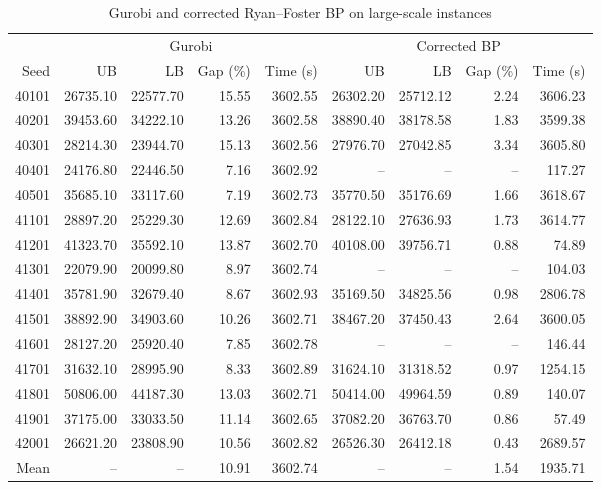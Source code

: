 \begin{table}[htbp]
\centering\small
\setlength{\tabcolsep}{3pt}
\caption{Gurobi and corrected Ryan--Foster BP on large-scale instances}
\begin{tabular}{r*{8}{r}}
\toprule
 & \multicolumn{4}{c}{Gurobi} & \multicolumn{4}{c}{Corrected BP} \\
\cmidrule(lr){2-5}\cmidrule(lr){6-9}
Seed & UB & LB & Gap (\%) & Time (s) & UB & LB & Gap (\%) & Time (s) \\
\midrule
40101 & 26735.10 & 22577.70 & 15.55 & 3602.55 & 26302.20 & 25712.12 & 2.24 & 3606.23 \\
40201 & 39453.60 & 34222.10 & 13.26 & 3602.58 & 38890.40 & 38178.58 & 1.83 & 3599.38 \\
40301 & 28214.30 & 23944.70 & 15.13 & 3602.56 & 27976.70 & 27042.85 & 3.34 & 3605.80 \\
40401 & 24176.80 & 22446.50 & 7.16 & 3602.92 & -- & -- & -- & 117.27 \\
40501 & 35685.10 & 33117.60 & 7.19 & 3602.73 & 35770.50 & 35176.69 & 1.66 & 3618.67 \\
41101 & 28897.20 & 25229.30 & 12.69 & 3602.84 & 28122.10 & 27636.93 & 1.73 & 3614.77 \\
41201 & 41323.70 & 35592.10 & 13.87 & 3602.70 & 40108.00 & 39756.71 & 0.88 & 74.89 \\
41301 & 22079.90 & 20099.80 & 8.97 & 3602.74 & -- & -- & -- & 104.03 \\
41401 & 35781.90 & 32679.40 & 8.67 & 3602.93 & 35169.50 & 34825.56 & 0.98 & 2806.78 \\
41501 & 38892.90 & 34903.60 & 10.26 & 3602.71 & 38467.20 & 37450.43 & 2.64 & 3600.05 \\
41601 & 28127.20 & 25920.40 & 7.85 & 3602.78 & -- & -- & -- & 146.44 \\
41701 & 31632.10 & 28995.90 & 8.33 & 3602.89 & 31624.10 & 31318.52 & 0.97 & 1254.15 \\
41801 & 50806.00 & 44187.30 & 13.03 & 3602.71 & 50414.00 & 49964.59 & 0.89 & 140.07 \\
41901 & 37175.00 & 33033.50 & 11.14 & 3602.65 & 37082.20 & 36763.70 & 0.86 & 57.49 \\
42001 & 26621.20 & 23808.90 & 10.56 & 3602.82 & 26526.30 & 26412.18 & 0.43 & 2689.57 \\
\midrule
Mean & -- & -- & 10.91 & 3602.74 & -- & -- & 1.54 & 1935.71 \\
\bottomrule
\end{tabular}
\par{}
\end{table}